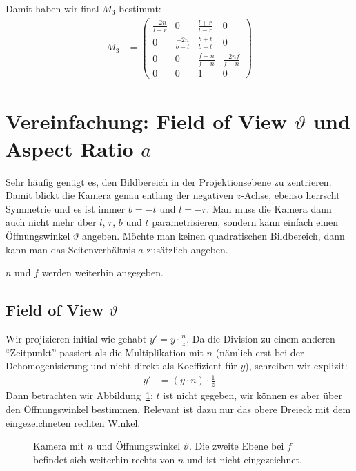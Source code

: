\documentclass[a4paper,parskip=full*]{scrartcl}
\begin{document}
Damit haben wir final $M_3$ bestimmt:
\begin{align*}
	M_3 &=
	\begin{pmatrix}
		\frac{-2n}{l - r} & 0 & \frac{l + r}{l - r} & 0  \\
		0 & \frac{-2n}{b - t} & \frac{b + t}{b - t} & 0  \\
		0 & 0 & \frac{f + n}{f - n} & \frac{-2nf}{f - n}  \\
		0 & 0 & 1 & 0
	\end{pmatrix}
\end{align*}

\section{Vereinfachung: Field of View $\vartheta$ und Aspect Ratio $a$}
Sehr häufig genügt es, den Bildbereich in der Projektionsebene zu
zentrieren. Damit blickt die Kamera genau entlang der negativen
$z$-Achse, ebenso herrscht Symmetrie und es ist immer $b = -t$ und $l =
-r$. Man muss die Kamera dann auch nicht mehr über $l$, $r$, $b$ und $t$
parametrisieren, sondern kann einfach einen Öffnungswinkel $\vartheta$
angeben. Möchte man keinen quadratischen Bildbereich, dann kann man das
Seitenverhältnis $a$ zusätzlich angeben.

$n$ und $f$ werden weiterhin angegeben.

\subsection{Field of View $\vartheta$}
Wir projizieren initial wie gehabt $y' = y \cdot \frac{n}{z}$. Da die
Division zu einem anderen "`Zeitpunkt"' passiert als die Multiplikation
mit $n$ (nämlich erst bei der Dehomogenisierung und nicht direkt als
Koeffizient für $y$), schreiben wir explizit:
\begin{align*}
	y' &= \left( y \cdot n \right) \cdot \frac{1}{z}
\end{align*}
Dann betrachten wir Abbildung~\ref{fovy}: $t$ ist nicht gegeben, wir
können es aber über den Öffnungswinkel bestimmen. Relevant ist dazu nur
das obere Dreieck mit dem eingezeichneten rechten Winkel.

\begin{figure}[h]
	\centering
	
	\caption%
	{Kamera mit $n$ und Öffnungswinkel $\vartheta$. Die zweite Ebene bei
	$f$ befindet sich weiterhin rechts von $n$ und ist nicht
	eingezeichnet.}

	\label{fovy}
\end{figure}
\end{document}

